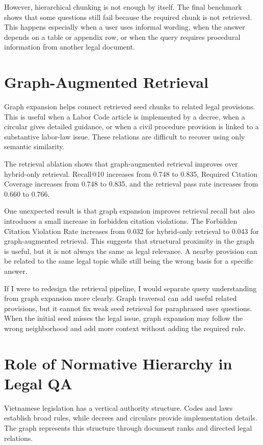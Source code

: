 However, hierarchical chunking is not enough by itself. The final benchmark shows that some questions still fail because the required chunk is not retrieved. This happens especially when a user uses informal wording, when the answer depends on a table or appendix row, or when the query requires procedural information from another legal document.

\section{Graph-Augmented Retrieval}
Graph expansion helps connect retrieved seed chunks to related legal provisions. This is useful when a Labor Code article is implemented by a decree, when a circular gives detailed guidance, or when a civil procedure provision is linked to a substantive labor-law issue. These relations are difficult to recover using only semantic similarity.

The retrieval ablation shows that graph-augmented retrieval improves over hybrid-only retrieval. Recall@10 increases from 0.748 to 0.835, Required Citation Coverage increases from 0.748 to 0.835, and the retrieval pass rate increases from 0.660 to 0.766.

One unexpected result is that graph expansion improves retrieval recall but also introduces a small increase in forbidden citation violations. The Forbidden Citation Violation Rate increases from 0.032 for hybrid-only retrieval to 0.043 for graph-augmented retrieval. This suggests that structural proximity in the graph is useful, but it is not always the same as legal relevance. A nearby provision can be related to the same legal topic while still being the wrong basis for a specific answer.

If I were to redesign the retrieval pipeline, I would separate query understanding from graph expansion more clearly. Graph traversal can add useful related provisions, but it cannot fix weak seed retrieval for paraphrased user questions. When the initial seed misses the legal issue, graph expansion may follow the wrong neighborhood and add more context without adding the required rule.

\section{Role of Normative Hierarchy in Legal QA}
Vietnamese legislation has a vertical authority structure. Codes and laws establish broad rules, while decrees and circulars provide implementation details. The graph represents this structure through document ranks and directed legal relations.

